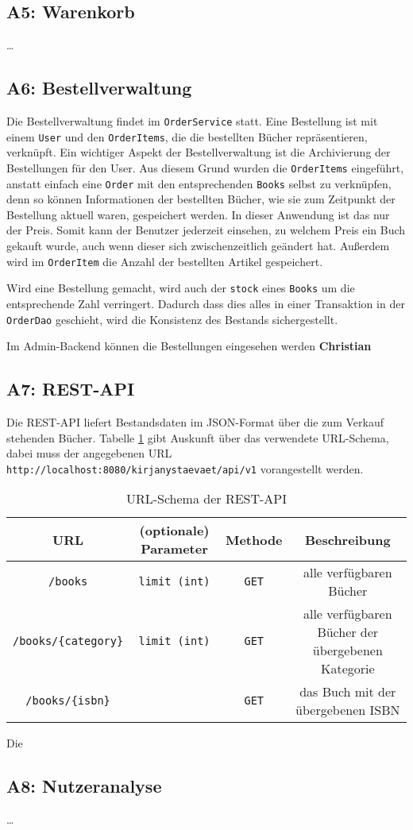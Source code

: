 	\subsection{A5: Warenkorb}
	\dots
	
	\subsection{A6: Bestellverwaltung}\label{sec:umsetzung:Bestellverwaltung}
	Die Bestellverwaltung findet im \texttt{OrderService} statt. Eine Bestellung ist mit einem \texttt{User} und den \texttt{OrderItems}, die die bestellten Bücher repräsentieren, verknüpft. Ein wichtiger Aspekt der Bestellverwaltung ist die Archivierung der Bestellungen für den User. Aus diesem Grund wurden die \texttt{OrderItems} eingeführt, anstatt einfach eine \texttt{Order} mit den entsprechenden \texttt{Books} selbst zu verknüpfen, denn so können Informationen der bestellten Bücher, wie sie zum Zeitpunkt der Bestellung aktuell waren, gespeichert werden. In dieser Anwendung ist das nur der Preis. Somit kann der Benutzer jederzeit einsehen, zu welchem Preis ein Buch gekauft wurde, auch wenn dieser sich zwischenzeitlich geändert hat. Außerdem wird im \texttt{OrderItem} die Anzahl der bestellten Artikel gespeichert.
	
	Wird eine Bestellung gemacht, wird auch der \texttt{stock} eines \texttt{Books} um die entsprechende Zahl verringert. Dadurch dass dies alles in einer Transaktion in der \texttt{OrderDao} geschieht, wird die Konsistenz des Bestands sichergestellt.
	
	Im Admin-Backend können die Bestellungen eingesehen werden \textbf{Christian}
	
	\subsection{A7: REST-API}\label{sec:umsetzung:Rest}
	Die REST-API liefert Bestandsdaten im JSON-Format über die zum Verkauf stehenden Bücher. Tabelle \ref{rest-api} gibt Auskunft über das verwendete URL-Schema, dabei muss der angegebenen URL \lstinline|http://localhost:8080/kirjanystaevaet/api/v1| vorangestellt werden.
	
	\begin{table}[h]
		\caption{URL-Schema der REST-API}
		\begin{tabular}{|c|c|c|c|}
			\hline
			URL & (optionale) Parameter & Methode & Beschreibung \\ \hline \hline
			\lstinline|/books| & \lstinline|limit (int)| & \lstinline|GET| & alle verfügbaren Bücher \\ \hline
			\lstinline|/books/{category}| & \lstinline|limit (int)| & \lstinline|GET| & alle verfügbaren Bücher der übergebenen Kategorie \\ \hline
			\lstinline|/books/{isbn}| & & \lstinline|GET| & das Buch mit der übergebenen ISBN \\ \hline
		\end{tabular} 
		\label{rest-api}
	\end{table}
	
	Die 
	
	\subsection{A8: Nutzeranalyse}
	\dots
	
	
